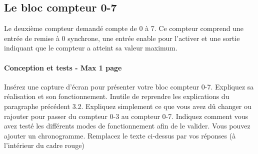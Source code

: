 \documentclass[a4paper]{article} %
\begin{document}
\subsection{Le bloc compteur 0-7}
Le deuxième compteur demandé compte de 0 à 7. Ce compteur comprend une entrée de remise à 0 synchrone, une entrée enable pour l’activer et une sortie indiquant que le compteur a atteint sa valeur maximum.
\begin{tcolorbox}[colframe=Monokaimagenta,colback=white]
\paragraph{Conception et tests - Max 1 page}
Insérez une capture d’écran pour présenter votre bloc compteur 0-7. Expliquez sa réalisation et son fonctionnement. Inutile de reprendre les explications du paragraphe précédent 3.2. Expliquez simplement ce que vous avez dû changer ou rajouter pour passer du compteur 0-3 au compteur 0-7.
Indiquez comment vous avez testé les différents modes de fonctionnement afin de le valider. Vous pouvez ajouter un chronogramme.
Remplacez le texte ci-dessus par vos réponses (à l’intérieur du cadre rouge)
\\
\end{tcolorbox}
\end{document}
